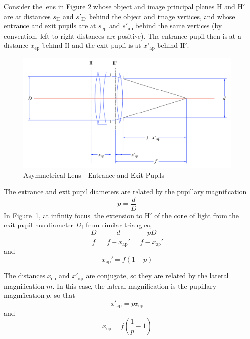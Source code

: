 \documentclass[11pt, oneside]{scrartcl}   	%
\begin{document}
Consider the lens in Figure 2 whose object and image principal planes H and H$'$ are at distances $s_\mathrm{H}$ and $s'_\mathrm{H'}$ behind the object and image vertices, and whose entrance and exit pupils are at $s_\mathrm{ep}$ and $s'_\mathrm{ap}$ behind the same vertices (by convention, left-to-right distances are positive). The entrance pupil then is at a distance $x_\mathrm{ep}$ behind H and the exit pupil is at $x'_\mathrm{ap}$ behind H$'$.
\begin{figure}[htbp] %
   \centering
   \includegraphics[width=\linewidth]{figure/fig_dofd_3} 
   \caption{Asymmetrical Lens—Entrance and Exit Pupils}
   \label{fig:asympup}
\end{figure}
The entrance and exit pupil diameters are related by the pupillary magnification
\begin{equation}
  p = \frac d D
  \label{eq:p}
\end{equation}
In Figure~\ref{fig:asympup}, at infinity focus, the extension to H$'$ of
the cone of light from the exit pupil has diameter $D$; from similar
triangles,
\begin{equation}
  \label{eq:79}
  \frac D f = \frac d{f-x_\mathrm{ap}'}=\frac{pD}{f-x_\mathrm{ap}'}
\end{equation}
and
\begin{equation}
  \label{eq:80}
  x_\mathrm{ap}'=f(1-p)
\end{equation}

The distances $x_\mathrm{ep}$ and $x'_\mathrm{ap}$ are conjugate, so they are related by the lateral magnification $m$. In
this case, the lateral magnification is the pupillary magnification
$p$, so that
\begin{equation}
  \label{eq:xapp}
  x'_\mathrm{ap} = p x_\mathrm{ep}
\end{equation}
and
\begin{equation}
  \label{eq:xep}
  x_\mathrm{ep} = f\left(\frac1p-1\right)
\end{equation}
\end{document}
